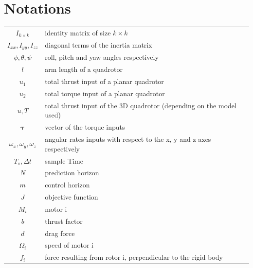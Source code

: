 \documentclass{thesisreport}
\begin{document}
 \section*{Notations}
  \begin{tabular}{cp{}}
  $I_{k \times k}$ & identity matrix of size $k \times k$ \\
  $I_{xx}, I_{yy}, I_{zz}$ & diagonal terms of the inertia matrix\\
  $\phi, \theta, \psi$ & roll, pitch and yaw angles respectively\\
  $l$ & arm length of a quadrotor \\
  $u_1$ & total thrust input of a planar quadrotor \\
  $u_2$ & total torque input of a planar quadrotor \\
  $u, T$ & total thrust input of the 3D quadrotor (depending on the model used)\\  
  $\bm{\tau}$ & vector of the torque inputs \\
  $\omega_x, \omega_y, \omega_z$ & angular rates inputs with respect to the x, y and z axes respectively \\
  $T_s, \Delta t$ & sample Time \\
  $N$ & prediction horizon \\
  $m$ & control horizon \\
  $J$ & objective function \\
  $M_i$ & motor i \\
  $b$ & thrust factor \\
  $d$ & drag force \\
  $\Omega_i$ & speed of motor i \\
  $f_i$ & force resulting from rotor i, perpendicular to the rigid body \\
  
  

\end{tabular}\\
 \newpage
 
\end{document}
